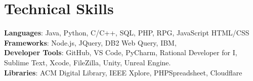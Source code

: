 \documentclass[letterpaper,11pt]{article}
\begin{document}
%
\section{Technical Skills}
 \begin{itemize}[leftmargin=0.15in, label={}]
    \small{\item{
     \textbf{Languages}{: Java, Python, C/C++, SQL, PHP, RPG, JavaScript HTML/CSS} \\
     \textbf{Frameworks}{: Node.js, JQuery, DB2 Web Query, IBM, } \\
     \textbf{Developer Tools}{: GitHub, VS Code, PyCharm, Rational Developer for I, Sublime Text, Xcode, FileZilla, Unity, Unreal Engine.} \\
     \textbf{Libraries}{: ACM Digital Library, IEEE Xplore, PHPSpreadsheet, Cloudflare}
    }}
 \end{itemize}


\end{document}
